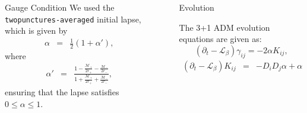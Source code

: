 \documentclass[noamssymb]{beamer}
\newlength{\sepwidth}
\newlength{\colwidth}
\newcommand{\separatorcolumn}{\begin{column}{\sepwidth}\end{column}}
\begin{document}
\begin{frame}[t]
\begin{columns}[t]
\begin{column}{\colwidth}
\begin{block}{Gauge Condition}
    We used the \texttt{twopunctures-averaged} initial lapse, which is given by
    \begin{eqnarray}
    	\alpha &=& \frac{1}{2}(1 + \alpha'),
    \end{eqnarray}
    where
    \begin{eqnarray}
    	\alpha' &=& \frac{1 - \frac{\mathcal{M}_+}{2r_+} - \frac{\mathcal{M}_-}{2r_-}}{1 + \frac{\mathcal{M}_+}{2r_+} + \frac{\mathcal{M}_-}{2r_-}},
    \end{eqnarray}
    ensuring that the lapse satisfies $0 \le \alpha \le 1$.

  \end{block}

%
%
%
%
%

\end{column}

\separatorcolumn

\begin{column}{\colwidth}

  \begin{block}{Evolution}
  	
  	The 3+1 ADM evolution equations are given as:
  	\begin{equation}
  		(\partial_t - \mathcal{L}_\beta)\gamma_{ij} = -2\alpha K_{ij},
  	\end{equation}
  	\begin{eqnarray}
  		(\partial_t - \mathcal{L}_\beta)K_{ij} &=& -D_i D_j \alpha + \alpha (R_{ij} + KK_{ij}-2K_{ik}K^k{}_{j}) +4\pi \alpha M_{ij},
  	\end{eqnarray}
  	

\end{block}
\end{column}
\end{columns}
\end{frame}
\end{document}
